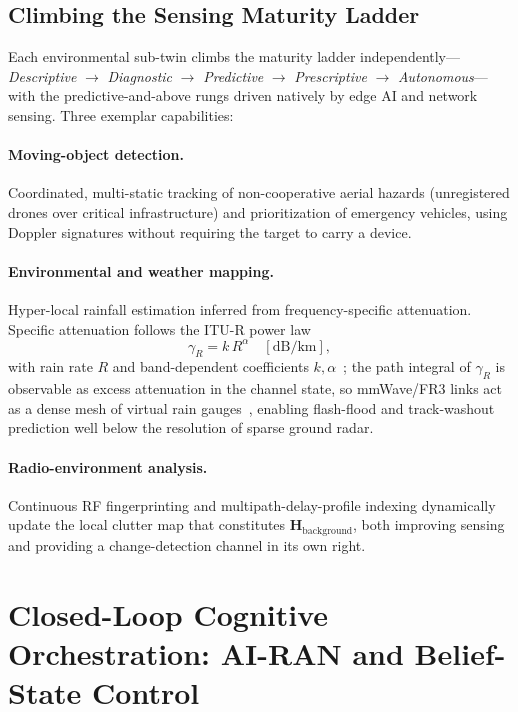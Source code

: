 \documentclass[10pt,twocolumn]{article}
\begin{document}
\subsection{Climbing the Sensing Maturity Ladder}
Each environmental sub-twin climbs the maturity ladder
independently---\emph{Descriptive} $\rightarrow$ \emph{Diagnostic} $\rightarrow$
\emph{Predictive} $\rightarrow$ \emph{Prescriptive} $\rightarrow$
\emph{Autonomous}---with the predictive-and-above rungs driven natively by edge
AI and network sensing. Three exemplar capabilities:

\paragraph{Moving-object detection.} Coordinated, multi-static tracking of
non-cooperative aerial hazards (unregistered drones over critical
infrastructure) and prioritization of emergency vehicles, using Doppler
signatures without requiring the target to carry a device.

\paragraph{Environmental and weather mapping.} Hyper-local rainfall estimation
inferred from frequency-specific attenuation. Specific attenuation follows the
ITU-R power law
\begin{equation}
\gamma_R = k\,R^{\alpha} \quad [\mathrm{dB/km}],
\end{equation}
with rain rate $R$ and band-dependent coefficients $k,\alpha$~\cite{itur838};
the path integral of $\gamma_R$ is observable as excess attenuation in the
channel state, so mmWave/FR3 links act as a dense mesh of virtual rain
gauges~\cite{raingauge}, enabling flash-flood and track-washout prediction well
below the resolution of sparse ground radar.

\paragraph{Radio-environment analysis.} Continuous RF fingerprinting and
multipath-delay-profile indexing dynamically update the local clutter map that
constitutes $\mathbf{H}_{\mathrm{background}}$, both improving sensing and
providing a change-detection channel in its own right.

\section{Closed-Loop Cognitive Orchestration: AI-RAN and Belief-State Control}
\label{sec:cognitive}
\end{document}

